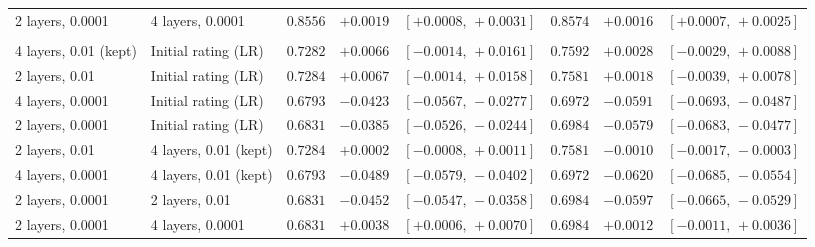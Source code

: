 \begin{table}[t]
\begin{tabular}{@{}llrrrrrr@{}}
2 layers, 0.0001 & 4 layers, 0.0001 & $0.8556$ & $+0.0019$ & $[+0.0008,\,+0.0031]$ & $0.8574$ & $+0.0016$ & $[+0.0007,\,+0.0025]$ \\
\addlinespace
\multicolumn{8}{l}{\emph{Borderline papers}} \\
4 layers, 0.01 (kept) & Initial rating (LR) & $0.7282$ & $+0.0066$ & $[-0.0014,\,+0.0161]$ & $0.7592$ & $+0.0028$ & $[-0.0029,\,+0.0088]$ \\
2 layers, 0.01 & Initial rating (LR) & $0.7284$ & $+0.0067$ & $[-0.0014,\,+0.0158]$ & $0.7581$ & $+0.0018$ & $[-0.0039,\,+0.0078]$ \\
4 layers, 0.0001 & Initial rating (LR) & $0.6793$ & $-0.0423$ & $[-0.0567,\,-0.0277]$ & $0.6972$ & $-0.0591$ & $[-0.0693,\,-0.0487]$ \\
2 layers, 0.0001 & Initial rating (LR) & $0.6831$ & $-0.0385$ & $[-0.0526,\,-0.0244]$ & $0.6984$ & $-0.0579$ & $[-0.0683,\,-0.0477]$ \\
2 layers, 0.01 & 4 layers, 0.01 (kept) & $0.7284$ & $+0.0002$ & $[-0.0008,\,+0.0011]$ & $0.7581$ & $-0.0010$ & $[-0.0017,\,-0.0003]$ \\
4 layers, 0.0001 & 4 layers, 0.01 (kept) & $0.6793$ & $-0.0489$ & $[-0.0579,\,-0.0402]$ & $0.6972$ & $-0.0620$ & $[-0.0685,\,-0.0554]$ \\
2 layers, 0.0001 & 2 layers, 0.01 & $0.6831$ & $-0.0452$ & $[-0.0547,\,-0.0358]$ & $0.6984$ & $-0.0597$ & $[-0.0665,\,-0.0529]$ \\
2 layers, 0.0001 & 4 layers, 0.0001 & $0.6831$ & $+0.0038$ & $[+0.0006,\,+0.0070]$ & $0.6984$ & $+0.0012$ & $[-0.0011,\,+0.0036]$ \\
\bottomrule
\end{tabular}
\end{table}
